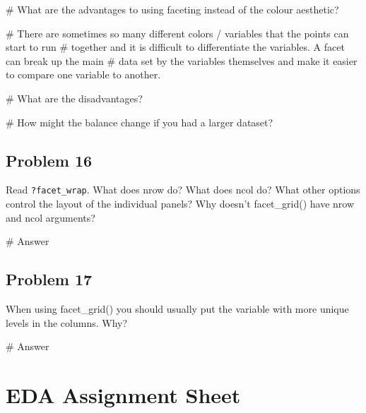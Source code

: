 \documentclass[
  letterpaper,
  DIV=11,
  numbers=noendperiod]{scrreprt}
\newenvironment{Shaded}{\begin{snugshade}}{\end{snugshade}}
\newcommand{\CommentTok}[1]{\textcolor[rgb]{0.37,0.37,0.37}{#1}}
\begin{document}
\begin{Shaded}
\begin{Highlighting}[]
\CommentTok{\# What are the advantages to using faceting instead of the colour aesthetic? }

\CommentTok{\# There are sometimes so many different colors / variables that the points can start to run}
\CommentTok{\# together and it is difficult to differentiate the variables. A facet can break up the main}
\CommentTok{\# data set by the variables themselves and make it easier to compare one variable to another.}

\CommentTok{\# What are the disadvantages? }


\CommentTok{\# How might the balance change if you had a larger dataset?}
\end{Highlighting}
\end{Shaded}

\section*{Problem 16}\label{problem-16-3}


Read \texttt{?facet\_wrap}. What does nrow do? What does ncol do? What
other options control the layout of the individual panels? Why doesn't
facet\_grid() have nrow and ncol arguments?

\begin{Shaded}
\begin{Highlighting}[]
\CommentTok{\# Answer}
\end{Highlighting}
\end{Shaded}

\section*{Problem 17}\label{problem-17-3}


When using facet\_grid() you should usually put the variable with more
unique levels in the columns. Why?

\begin{Shaded}
\begin{Highlighting}[]
\CommentTok{\# Answer}
\end{Highlighting}
\end{Shaded}

\chapter*{EDA Assignment Sheet}\label{eda-assignment-sheet}
\end{document}
